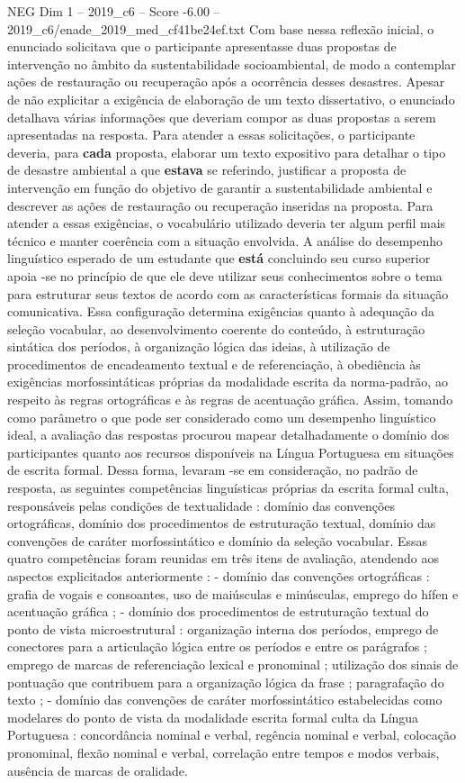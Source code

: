 \begin{textsample}{NEG Dim 1 – 2019\_c6 – Score -6.00 – 2019\_c6/enade\_2019\_med\_cf41be24ef.txt}
Com base nessa reflexão inicial, o enunciado solicitava que o participante apresentasse duas propostas de intervenção no âmbito da sustentabilidade socioambiental, de modo a contemplar ações de restauração ou recuperação após a ocorrência desses desastres.
Apesar de não explicitar a exigência de elaboração de um texto dissertativo, o enunciado detalhava várias informações que deveriam compor as duas propostas a serem apresentadas na resposta.
Para atender a essas solicitações, o participante deveria, para \textbf{cada} proposta, elaborar um texto expositivo para detalhar o tipo de desastre ambiental a que \textbf{estava} se referindo, justificar a proposta de intervenção em função do objetivo de garantir a sustentabilidade ambiental e descrever as ações de restauração ou recuperação inseridas na proposta.
Para atender a essas exigências, o vocabulário utilizado deveria ter algum perfil mais técnico e manter coerência com a situação envolvida.
A análise do desempenho linguístico esperado de um estudante que \textbf{está} concluindo seu curso superior apoia -se no princípio de que ele deve utilizar seus conhecimentos sobre o tema para estruturar seus textos de acordo com as características formais da situação comunicativa.
Essa configuração determina exigências quanto à adequação da seleção vocabular, ao desenvolvimento coerente do conteúdo, à estruturação sintática dos períodos, à organização lógica das ideias, à utilização de procedimentos de encadeamento textual e de referenciação, à obediência às exigências morfossintáticas próprias da modalidade escrita da norma-padrão, ao respeito às regras ortográficas e às regras de acentuação gráfica.
Assim, tomando como parâmetro o que pode ser considerado como um desempenho linguístico ideal, a avaliação das respostas procurou mapear detalhadamente o domínio dos participantes quanto aos recursos disponíveis na Língua Portuguesa em situações de escrita formal.
Dessa forma, levaram -se em consideração, no padrão de resposta, as seguintes competências linguísticas próprias da escrita formal culta, responsáveis pelas condições de textualidade : domínio das convenções ortográficas, domínio dos procedimentos de estruturação textual, domínio das convenções de caráter morfossintático e domínio da seleção vocabular.
Essas quatro competências foram reunidas em três itens de avaliação, atendendo aos aspectos explicitados anteriormente : - domínio das convenções ortográficas : grafia de vogais e consoantes, uso de maiúsculas e minúsculas, emprego do hífen e acentuação gráfica ; - domínio dos procedimentos de estruturação textual do ponto de vista microestrutural : organização interna dos períodos, emprego de conectores para a articulação lógica entre os períodos e entre os parágrafos ; emprego de marcas de referenciação lexical e pronominal ; utilização dos sinais de pontuação que contribuem para a organização lógica da frase ; paragrafação do texto ; - domínio das convenções de caráter morfossintático estabelecidas como modelares do ponto de vista da modalidade escrita formal culta da Língua Portuguesa : concordância nominal e verbal, regência nominal e verbal, colocação pronominal, flexão nominal e verbal, correlação entre tempos e modos verbais, ausência de marcas de oralidade.

\end{textsample}
